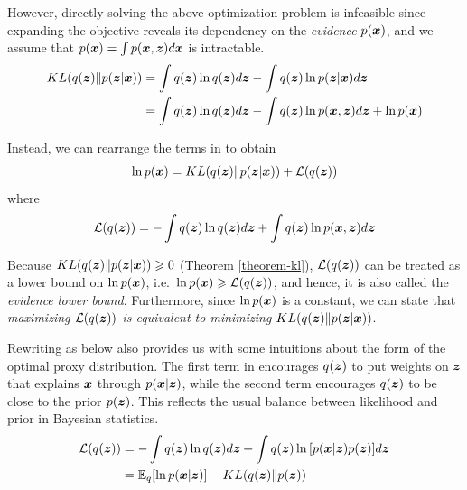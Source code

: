 However, directly solving the above optimization problem is infeasible since expanding the objective reveals its dependency on the \emph{evidence} $p(\boldsymbol{x})$, and we assume that $p(\boldsymbol{x}) = \int{p(\boldsymbol{x}, \boldsymbol{z})d\boldsymbol{x}}$ is intractable.
\begin{align}
    KL(q(\boldsymbol{z})\|p(\boldsymbol{z} \vert \boldsymbol{x})) 
    & = \int{q(\boldsymbol{z})\ln{q(\boldsymbol{z})}d\boldsymbol{z}} 
        - \int{q(\boldsymbol{z})\ln{p(\boldsymbol{z} \vert \boldsymbol{x})}d\boldsymbol{z}}
    \nonumber
    \\
    & = \int{q(\boldsymbol{z})\ln{q(\boldsymbol{z})}d\boldsymbol{z}} 
        - \int{q(\boldsymbol{z})\ln{p(\boldsymbol{x},\boldsymbol{z})}d\boldsymbol{z}}
        + \ln{p(\boldsymbol{x})}
    \label{eq-vi-objective-expanded}
\end{align}

Instead, we can rearrange the terms in  to obtain
\begin{align}
    \ln{p(\boldsymbol{x})} 
    = KL(q(\boldsymbol{z})\|p(\boldsymbol{z} \vert \boldsymbol{x})) 
        + \mathcal{L}(q(\boldsymbol{z}))
\end{align}
where
\begin{align}
    \mathcal{L}(q(\boldsymbol{z})) 
    = - \int{q(\boldsymbol{z})\ln{q(\boldsymbol{z})}d\boldsymbol{z}} 
        + \int{q(\boldsymbol{z})\ln{p(\boldsymbol{x},\boldsymbol{z})}d\boldsymbol{z}} 
    \label{eq-elbo}
\end{align}

Because $KL(q(\boldsymbol{z})\|p(\boldsymbol{z} \vert \boldsymbol{x})) \geqslant 0$ (Theorem \ref{theorem-kl}), $\mathcal{L}(q(\boldsymbol{z}))$ can be treated as a lower bound on $\ln{p(\boldsymbol{x}})$, i.e.\ $\ln{p(\boldsymbol{x}}) \geqslant \mathcal{L}(q(\boldsymbol{z}))$, and hence, it is also called the \emph{evidence lower bound}.
Furthermore, since $\ln{p(\boldsymbol{x})}$ is a constant, we can state that \emph{maximizing $\mathcal{L}(q(\boldsymbol{z}))$ is equivalent to minimizing $KL(q(\boldsymbol{z})\|p(\boldsymbol{z} \vert \boldsymbol{x}))$}.

Rewriting  as  below also provides us with some intuitions about the form of the optimal proxy distribution.
The first term in  encourages $q(\boldsymbol{z})$ to put weights on $\boldsymbol{z}$ that explains $\boldsymbol{x}$ through $p(\boldsymbol{x}\vert\boldsymbol{z})$, while the second term encourages $q(\boldsymbol{z})$ to be close to the prior $p(\boldsymbol{z})$.
This reflects the usual balance between likelihood and prior in Bayesian statistics.
\begin{align}
    \mathcal{L}(q(\boldsymbol{z})) 
    & = - \int{q(\boldsymbol{z})\ln{q(\boldsymbol{z})}d\boldsymbol{z}} 
        + \int{q(\boldsymbol{z})\ln{[p(\boldsymbol{x} \vert \boldsymbol{z})p(\boldsymbol{z})]}d\boldsymbol{z}} 
    \nonumber
    \\
    & = \mathbb{E}_q[\ln{p(\boldsymbol{x} \vert \boldsymbol{z})}] 
        - KL(q(\boldsymbol{z})\|p(\boldsymbol{z}))
    \label{eq-elbo-rewrite}
\end{align}

